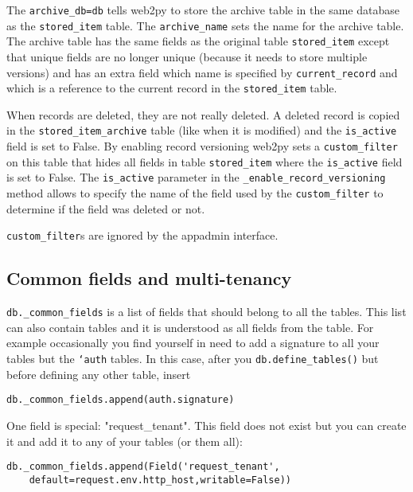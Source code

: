 \documentclass[justified,sixbynine,notoc]{tufte-book}
\def\ft{\small\tt}
\def\inxx#1{\index{#1}}
\begin{document}
\begin{fullwidth}
The {\ft archive\_db=db} tells web2py to store the archive table in the same database as the {\ft stored\_item} table. The {\ft archive\_name} sets the name for the archive table. The archive table has the same fields as the original table {\ft stored\_item} except that unique fields are no longer unique (because it needs to store multiple versions) and has an extra field which name is specified by {\ft current\_record} and which is a reference to the current record in the {\ft stored\_item} table.

When records are deleted, they are not really deleted. A deleted record is copied in the {\ft stored\_item\_archive} table (like when it is modified) and the {\ft is\_active} field is set to False. By enabling record versioning web2py sets a {\ft custom\_filter} on this table that hides all fields in table {\ft stored\_item} where the {\ft is\_active} field is set to False. The {\ft is\_active} parameter in the {\ft \_enable\_record\_versioning} method allows to specify the name of the field used by the {\ft custom\_filter} to determine if the field was deleted or not.

{\ft custom\_filter}s are ignored by the appadmin interface.

\goodbreak\subsection{Common fields and multi-tenancy}

\inxx{common fields}
\inxx{multi tenancy}

{\ft db.\_common\_fields} is a list of fields that should belong to all the tables. This list can also contain tables and it is understood as all fields from the table. For example occasionally you find yourself in need to add a signature to all your tables but the {\ft `auth} tables. In this case, after you {\ft db.define\_tables()} but before defining any other table, insert

\begin{lstlisting}
db._common_fields.append(auth.signature)
\end{lstlisting}

One field is special: "request\_tenant".
This field does not exist but you can create it and add it to any of your tables (or them all):

\begin{lstlisting}
db._common_fields.append(Field('request_tenant',
    default=request.env.http_host,writable=False))
\end{lstlisting}


\end{fullwidth}
\end{document}
